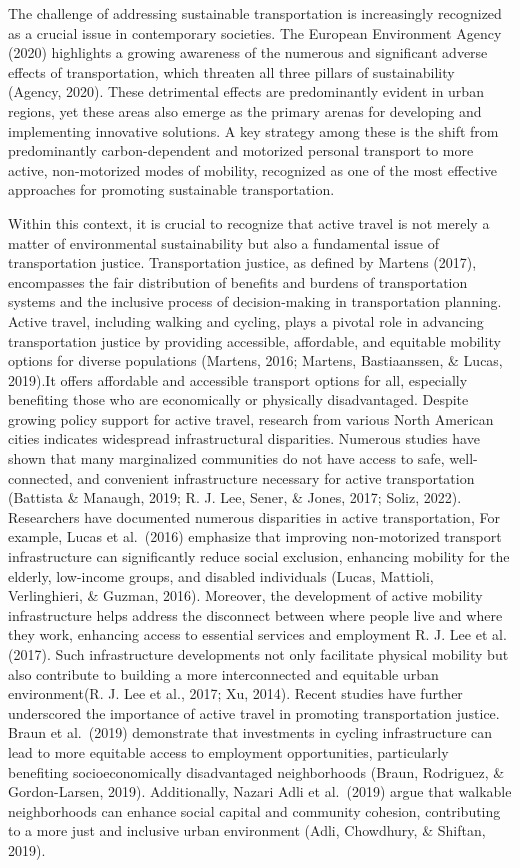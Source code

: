 \documentclass[
11pt, %
oneside, %
english, %
singlespacing, %
]{macthesis} %
\begin{document}
The challenge of addressing sustainable transportation is increasingly recognized as a crucial issue in contemporary societies. The European Environment Agency (2020) highlights a growing awareness of the numerous and significant adverse effects of transportation, which threaten all three pillars of sustainability (Agency, 2020). These detrimental effects are predominantly evident in urban regions, yet these areas also emerge as the primary arenas for developing and implementing innovative solutions. A key strategy among these is the shift from predominantly carbon-dependent and motorized personal transport to more active, non-motorized modes of mobility, recognized as one of the most effective approaches for promoting sustainable transportation.

Within this context, it is crucial to recognize that active travel is not merely a matter of environmental sustainability but also a fundamental issue of transportation justice. Transportation justice, as defined by Martens (2017), encompasses the fair distribution of benefits and burdens of transportation systems and the inclusive process of decision-making in transportation planning. Active travel, including walking and cycling, plays a pivotal role in advancing transportation justice by providing accessible, affordable, and equitable mobility options for diverse populations (Martens, 2016; Martens, Bastiaanssen, \& Lucas, 2019).It offers affordable and accessible transport options for all, especially benefiting those who are economically or physically disadvantaged. Despite growing policy support for active travel, research from various North American cities indicates widespread infrastructural disparities. Numerous studies have shown that many marginalized communities do not have access to safe, well-connected, and convenient infrastructure necessary for active transportation (Battista \& Manaugh, 2019; R. J. Lee, Sener, \& Jones, 2017; Soliz, 2022). Researchers have documented numerous disparities in active transportation, For example, Lucas et al.~(2016) emphasize that improving non-motorized transport infrastructure can significantly reduce social exclusion, enhancing mobility for the elderly, low-income groups, and disabled individuals (Lucas, Mattioli, Verlinghieri, \& Guzman, 2016). Moreover, the development of active mobility infrastructure helps address the disconnect between where people live and where they work, enhancing access to essential services and employment R. J. Lee et al. (2017). Such infrastructure developments not only facilitate physical mobility but also contribute to building a more interconnected and equitable urban environment(R. J. Lee et al., 2017; Xu, 2014). Recent studies have further underscored the importance of active travel in promoting transportation justice. Braun et al.~(2019) demonstrate that investments in cycling infrastructure can lead to more equitable access to employment opportunities, particularly benefiting socioeconomically disadvantaged neighborhoods (Braun, Rodriguez, \& Gordon-Larsen, 2019). Additionally, Nazari Adli et al.~(2019) argue that walkable neighborhoods can enhance social capital and community cohesion, contributing to a more just and inclusive urban environment (Adli, Chowdhury, \& Shiftan, 2019).
\end{document}
